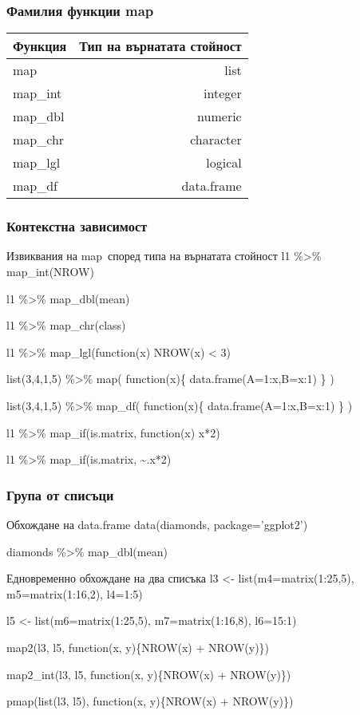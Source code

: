 \documentclass{beamer}
\begin{document}
\begin{frame}
\frametitle{Фамилия функции map}
\begin{table}[ht]
\centering
\begin{tabular}{|l|r|} 
  \hline
  Функция & Тип на върнатата стойност \\ [0.1ex] 
  \hline\hline
  map & list \\
  \hline
  map\_int & integer \\
  \hline
  map\_dbl & numeric \\
  \hline
  map\_chr & character \\
  \hline
  map\_lgl & logical \\
  \hline
  map\_df & data.frame \\
  \hline
\end{tabular}
\end{table}
\end{frame}

\begin{frame}
\frametitle{Контекстна зависимост}
\begin{block}{Извиквания на map\, според типа на върнатата стойност}
l1 \%>\% map\_int(NROW)

l1 \%>\% map\_dbl(mean)

l1 \%>\% map\_chr(class)

l1 \%>\% map\_lgl(function(x) NROW(x) < 3)

list(3,4,1,5) \%>\% map( function(x)\{ data.frame(A=1:x,B=x:1) \} )

list(3,4,1,5) \%>\% map\_df( function(x)\{ data.frame(A=1:x,B=x:1) \} )

l1 \%>\% map\_if(is.matrix, function(x) x*2)

l1 \%>\% map\_if(is.matrix, \textasciitilde  .x*2)
\end{block}
\end{frame}

\begin{frame}
\frametitle{Група от списъци}
\begin{block}{Обхождане на data.frame}
data(diamonds, package='ggplot2')

diamonds \%>\% map\_dbl(mean)
\end{block}

\begin{block}{Едновременно обхождане на два списъка}
l3 <- list(m4=matrix(1:25,5), m5=matrix(1:16,2), l4=1:5)

l5 <- list(m6=matrix(1:25,5), m7=matrix(1:16,8), l6=15:1)

map2(l3, l5, function(x, y)\{NROW(x) + NROW(y)\})

map2\_int(l3, l5, function(x, y)\{NROW(x) + NROW(y)\})

pmap(list(l3, l5), function(x, y)\{NROW(x) + NROW(y)\})
\end{block}
\end{frame}
\end{document}
